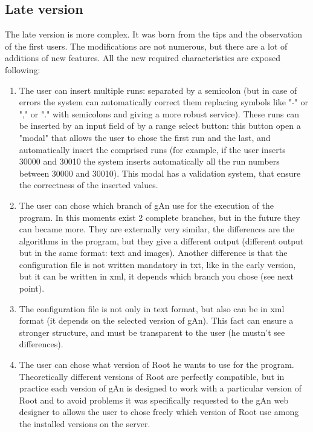 \subsection{Late version}
The late version is more complex. It was born from the tips and the observation of the first users. The modifications are not numerous, but there are a lot of additions of new features. All the new required characteristics are exposed following:

\begin{enumerate}

\item The user can insert multiple runs: separated by a semicolon (but in case of errors the system can automatically correct them replacing symbols like "-" or "," or "." with semicolons and giving a more robust service). These runs can be inserted by an input field of by a range select button: this button open a "modal" that allows the user to chose the first run and the last, and automatically insert the comprised runs (for example, if the user inserts 30000 and 30010 the system inserts automatically all the run numbers between 30000 and 30010). This modal has a validation system, that ensure the correctness of the inserted values. 

\item The user can chose which branch of gAn use for the execution of the program. In this moments exist 2 complete branches, but in the future they can became more. They are externally very similar, the differences are the algorithms in the program, but they give a different output (different output but in the same format: text and images). Another difference is that the configuration file is not written mandatory in txt, like in the early version, but it can be written in xml, it depends which branch you chose (see next point). 

\item The configuration file is not only in text format, but also can be in xml format (it depends on the selected version of gAn). This fact can ensure a stronger structure, and must be transparent to the user (he mustn't see differences).

\item The user can chose what version of Root he wants to use for the program. Theoretically different versions of Root are perfectly compatible, but in practice each version of gAn is designed to work with a particular version of Root and to avoid problems it was specifically requested to the gAn web designer to allows the user to chose freely which version of Root use among the installed versions on the server.  


\end{enumerate}
